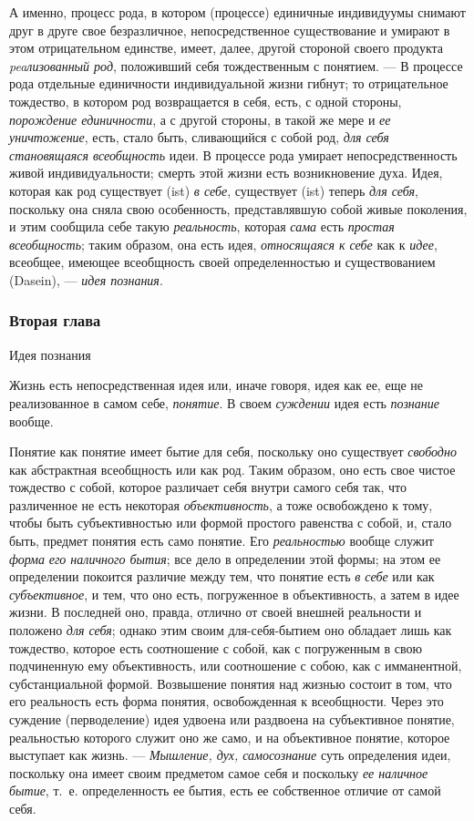 \documentclass[twoside]{article}
\begin{document}
{{{А именно, процесс рода, в котором (процессе) единичные
индивидуумы снимают друг в друге свое безразличное, непосредственное
существование и умирают в этом отрицательном единстве, имеет, далее, другой
стороной своего продукта
{\em peaлизованный род},
положивший себя тождественным с понятием. — В
процессе рода отдельные единичности индивидуальной жизни гибнут; то
отрицательное тождество, в котором род возвращается в себя, есть, с одной
стороны, {\em порождение единичности},
а с другой стороны, в такой же мере и
{\em ее уничтожение},
есть, стало быть, сливающийся с собой род,
{\em для себя становящаяся всеобщность}
идеи. В процессе рода умирает непосредственность живой
индивидуальности; смерть этой жизни есть возникновение духа. Идея, которая
как род существует (ist) {\em в себе},
существует (ist) теперь
{\em для себя}, поскольку
она сняла свою особенность, представлявшую собой живые поколения, и этим
сообщила себе такую {\em реальность},
которая {\em сама}
есть {\em простая
всеобщность}; таким образом, она есть идея,
{\em относящаяся к себе}
как к {\em идее},
всеобщее, имеющее всеобщность своей определенностью и
существованием (Dasein), — {\em идея
познания}.

\subsubsection[Вторая глава Идея познания]{Вторая глава}\newline Идея познания}
Жизнь есть непосредственная идея или, иначе говоря, идея как
ее, еще не реализованное в самом себе,
{\em понятие}. В своем
{\em суждении} идея есть
{\em познание} вообще.

Понятие как понятие имеет бытие для себя, поскольку оно
существует {\em свободно}
как абстрактная всеобщность или как род. Таким образом, оно
есть свое чистое тождество с собой, которое различает себя внутри самого
себя так, что различенное не есть некоторая
{\em объективность}, а
тоже освобождено к тому, чтобы быть субъективностью или формой простого
равенства с собой, и, стало быть, предмет понятия есть само понятие. Его
{\em реальностью} вообще
служит {\em форма}
{\em его наличного бытия};
все дело в определении этой формы; на этом ее определении
покоится различие между тем, что понятие есть
{\em в себе} или как
{\em субъективное}, и
тем, что оно есть, погруженное в объективность, а затем в идее жизни. В
последней оно, правда, отлично от своей внешней реальности и положено
{\em для себя}; однако
этим своим для-себя-бытием оно обладает лишь как тождество, которое есть
соотношение с собой, как с погруженным в свою подчиненную ему
объективность, или соотношение с собою, как с имманентной, субстанциальной
формой. Возвышение понятия над жизнью состоит в том, что его реальность
есть форма понятия, освобожденная к всеобщности. Через это суждение
(перводеление) идея удвоена или раздвоена на субъективное понятие,
реальностью которого служит оно же само, и на объективное понятие, которое
выступает как жизнь. — {\em Мышление,
дух, самосознание} суть определения идеи, поскольку она
имеет своим предметом самое себя и поскольку
{\em ее наличное бытие},
т.~е. определенность ее бытия, есть ее собственное отличие от
самой себя.

}}
\end{document}
